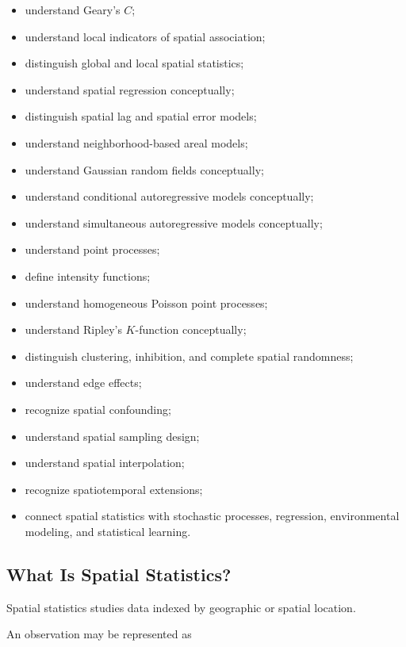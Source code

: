 {\begin{itemize}
    \item understand Geary's \(C\);
    \item understand local indicators of spatial association;
    \item distinguish global and local spatial statistics;
    \item understand spatial regression conceptually;
    \item distinguish spatial lag and spatial error models;
    \item understand neighborhood-based areal models;
    \item understand Gaussian random fields conceptually;
    \item understand conditional autoregressive models conceptually;
    \item understand simultaneous autoregressive models conceptually;
    \item understand point processes;
    \item define intensity functions;
    \item understand homogeneous Poisson point processes;
    \item understand Ripley's \(K\)-function conceptually;
    \item distinguish clustering, inhibition, and complete spatial
          randomness;
    \item understand edge effects;
    \item recognize spatial confounding;
    \item understand spatial sampling design;
    \item understand spatial interpolation;
    \item recognize spatiotemporal extensions;
    \item connect spatial statistics with stochastic processes,
          regression, environmental modeling, and statistical learning.
\end{itemize}
}

\subsection{What Is Spatial Statistics?}
\label{subsec:what-is-spatial-statistics}

Spatial statistics studies data indexed by geographic or spatial
location.

An observation may be represented as

